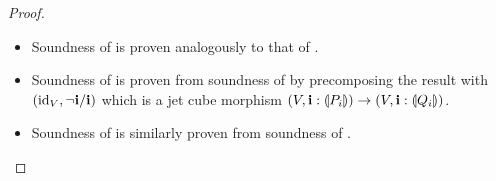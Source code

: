 \documentclass[a4paper]{memoir}
\begin{document}
\begin{proof}
\begin{itemize}
\begin{itemize}
\begin{itemize}
\begin{itemize}
					\item If $j \neq i$, then we have $\vec v \jet_j \vec v'$ in $\JEP(\UFsymcube_i V)$, whence $f(\vec v) \jet_j f(\vec v')$ in $\JEP(W)$, whence $g(\vec v, u) = (f(\vec v), z) \jet_j (f(\vec v'), z) = g(\vec v', u)$ in $\JEP(W, \dm i : \rival{\jet_i})$.
				\end{itemize}
			\end{itemize}
		\end{itemize}
		
		\item Soundness of  is proven analogously to that of .
		
		\item Soundness of  is proven from soundness of \allowbreak {} by precomposing the result with $(\mathrm{id}_V, \lnot \mathbf{i} / \mathbf{i})$ which is a jet cube morphism $(V, \mathbf{i} : {\llparenthesis P_i \rrparenthesis}) \to (V, \mathbf{i} : {\llparenthesis Q_i \rrparenthesis})$.
		
		\item Soundness of  is similarly proven from soundness of .
		

\end{itemize}
\end{proof}
\end{document}
